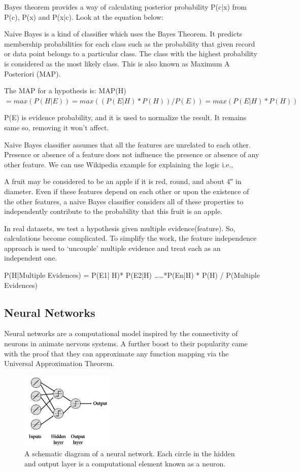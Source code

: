 \documentclass[12pt]{article}
\numberwithin{equation}{section}
\numberwithin{table}{section}
\numberwithin{figure}{section}
\begin{document}
Bayes theorem provides a way of calculating posterior probability P(c|x) from P(c), P(x) and P(x|c). Look at the equation below:



Naive Bayes is a kind of classifier which uses the Bayes Theorem. It predicts membership probabilities for each class such as the probability that given record or data point belongs to a particular class.  The class with the highest probability is considered as the most likely class. This is also known as Maximum A Posteriori (MAP).

The MAP for a hypothesis is:
MAP(H)
$= max( P(H|E) )
=  max( (P(E|H)*P(H))/P(E))
= max(P(E|H)*P(H))
$

P(E) is evidence probability, and it is used to normalize the result. It remains same so, removing it won’t affect.

Naive Bayes classifier assumes that all the features are unrelated to each other. Presence or absence of a feature does not influence the presence or absence of any other feature. We can use Wikipedia example for explaining the logic i.e.,

A fruit may be considered to be an apple if it is red, round, and about 4″ in diameter.  Even if these features depend on each other or upon the existence of the other features, a naive Bayes classifier considers all of these properties to independently contribute to the probability that this fruit is an apple.

In real datasets, we test a hypothesis given multiple evidence(feature). So, calculations become complicated. To simplify the work, the feature independence approach is used to ‘uncouple’ multiple evidence and treat each as an independent one.

P(H|Multiple Evidences) =  P(E1| H)* P(E2|H) ……*P(En|H) * P(H) / P(Multiple Evidences)



\subsection{Neural Networks} \label{neuralnetwork}

Neural networks are a computational model inspired by the connectivity of neurons in animate nervous systems.
A further boost to their popularity came with the proof that they can approximate any function mapping via the Universal Approximation Theorem. 

\begin{figure}[H] \centering
	\includegraphics[width=0.4\textwidth]{image5.png}
	\caption{A schematic diagram of a neural network. Each circle in the hidden and output layer is a computational element known as a neuron. }
	\label{figure5}
\end{figure}
\end{document}
